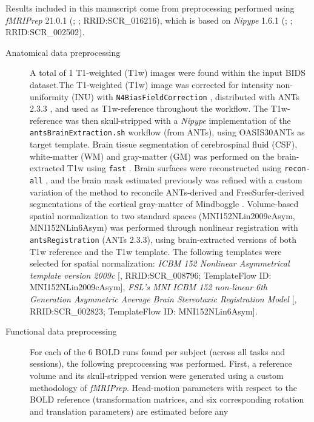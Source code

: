 \documentclass[
]{article}
\author{}
\date{}
\begin{document}
Results included in this manuscript come from preprocessing performed
using \emph{fMRIPrep} 21.0.1 (\citet{fmriprep1}; \citet{fmriprep2};
RRID:SCR\_016216), which is based on \emph{Nipype} 1.6.1
(\citet{nipype1}; \citet{nipype2}; RRID:SCR\_002502).

\begin{description}
\item[Anatomical data preprocessing]
A total of 1 T1-weighted (T1w) images were found within the input BIDS
dataset.The T1-weighted (T1w) image was corrected for intensity
non-uniformity (INU) with \texttt{N4BiasFieldCorrection} \citep{n4},
distributed with ANTs 2.3.3 \citep[RRID:SCR\_004757]{ants}, and used as
T1w-reference throughout the workflow. The T1w-reference was then
skull-stripped with a \emph{Nipype} implementation of the
\texttt{antsBrainExtraction.sh} workflow (from ANTs), using OASIS30ANTs
as target template. Brain tissue segmentation of cerebrospinal fluid
(CSF), white-matter (WM) and gray-matter (GM) was performed on the
brain-extracted T1w using \texttt{fast} \citep[FSL 6.0.5.1:57b01774,
RRID:SCR\_002823,][]{fsl_fast}. Brain surfaces were reconstructed using
\texttt{recon-all} \citep[FreeSurfer 6.0.1,
RRID:SCR\_001847,][]{fs_reconall}, and the brain mask estimated
previously was refined with a custom variation of the method to
reconcile ANTs-derived and FreeSurfer-derived segmentations of the
cortical gray-matter of Mindboggle
\citep[RRID:SCR\_002438,][]{mindboggle}. Volume-based spatial
normalization to two standard spaces (MNI152NLin2009cAsym,
MNI152NLin6Asym) was performed through nonlinear registration with
\texttt{antsRegistration} (ANTs 2.3.3), using brain-extracted versions
of both T1w reference and the T1w template. The following templates were
selected for spatial normalization: \emph{ICBM 152 Nonlinear
Asymmetrical template version 2009c} {[}\citet{mni152nlin2009casym},
RRID:SCR\_008796; TemplateFlow ID: MNI152NLin2009cAsym{]}, \emph{FSL's
MNI ICBM 152 non-linear 6th Generation Asymmetric Average Brain
Stereotaxic Registration Model} {[}\citet{mni152nlin6asym},
RRID:SCR\_002823; TemplateFlow ID: MNI152NLin6Asym{]}.
\item[Functional data preprocessing]
For each of the 6 BOLD runs found per subject (across all tasks and
sessions), the following preprocessing was performed. First, a reference
volume and its skull-stripped version were generated using a custom
methodology of \emph{fMRIPrep}. Head-motion parameters with respect to
the BOLD reference (transformation matrices, and six corresponding
rotation and translation parameters) are estimated before any

\end{description}
\end{document}
